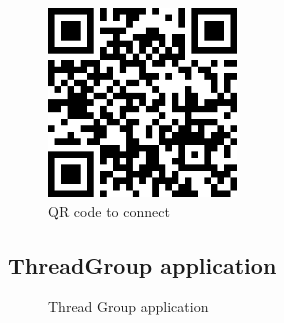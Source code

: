 \begin{figure}[!htb]
    \centering
    \includegraphics[width=5cm]{img/LampNodeUTF8QRCode5x.png}
    \caption{QR code to connect}
    \label{fig:qrcode}
\end{figure}

\subsection{ThreadGroup application}
\begin{figure}[!htb]
    \centering
    \caption{Thread Group application}
    \label{fig:application}
\end{figure}
